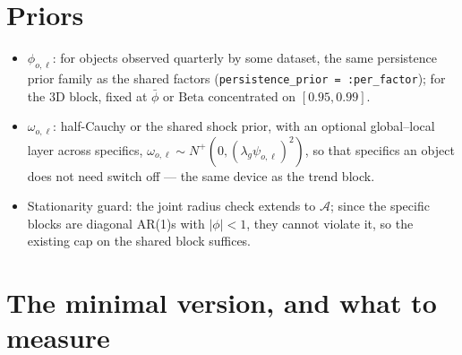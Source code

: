 \documentclass[11pt]{article}
\newcommand{\code}[1]{\texttt{#1}}
\begin{document}
\section{Priors}\label{sec:priors}

\begin{itemize}[leftmargin=*]
  \item $\phi_{o,\ell}$: for objects observed quarterly by some dataset, the
        same persistence prior family as the shared factors
        (\code{persistence\_prior = :per\_factor}); for the 3D block, fixed at
        $\bar\phi$ or $\mathrm{Beta}$ concentrated on $[0.95,0.99]$.
  \item $\omega_{o,\ell}$: half-Cauchy or the shared shock prior, with an
        optional global--local layer across specifics,
        $\omega_{o,\ell} \sim N^{+}(0,(\lambda_g\psi_{o,\ell})^2)$, so that
        specifics an object does not need switch off --- the same device as the
        trend block.
  \item Stationarity guard: the joint radius check extends to $\mathcal{A}$;
        since the specific blocks are diagonal AR(1)s with $|\phi|<1$, they
        cannot violate it, so the existing cap on the shared block suffices.
\end{itemize}

\section{The minimal version, and what to measure}\label{sec:minimal}
\end{document}

